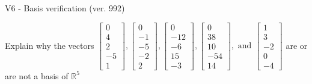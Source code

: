 \begin{exercise}
  \begin{exerciseTitle}V6 - Basis verification (ver. 992)\end{exerciseTitle}
  \begin{exerciseStatement}
    Explain why the vectors \(\left[\begin{array}{r}
0 \\
4 \\
2 \\
-5 \\
1
\end{array}\right] , \left[\begin{array}{r}
0 \\
-1 \\
-5 \\
-2 \\
2
\end{array}\right] , \left[\begin{array}{r}
0 \\
-12 \\
-6 \\
15 \\
-3
\end{array}\right] , \left[\begin{array}{r}
0 \\
38 \\
10 \\
-54 \\
14
\end{array}\right] , \text{ and } \left[\begin{array}{r}
1 \\
3 \\
-2 \\
0 \\
-4
\end{array}\right]\) are or are not a basis of \(\mathbb{R}^5\)	



\end{exerciseStatement}
\end{exercise}

